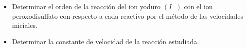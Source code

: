 \documentclass[../main.tex]{subfiles}
\begin{document}
\begin{itemize}
    \item Determinar el orden de la reacción del ion yoduro $(I^-)$ con el ion 
    peroxodisulfato con respecto a cada reactivo por el método de las velocidades 
    iniciales.
    \item Determinar la constante de velocidad de la reacción estudiada.
\end{itemize}
\end{document}
